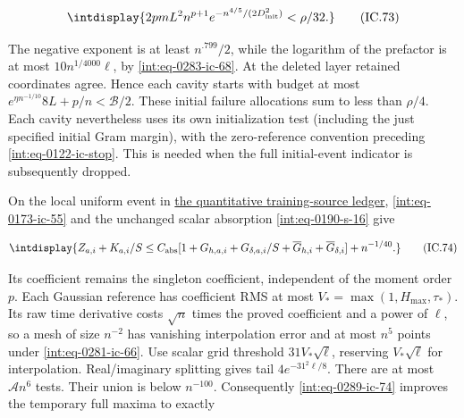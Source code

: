 \begingroup\renewcommand{\theHequation}{intdisplay.668}
\begin{equation}
\intdisplay{
2pmL^2n^{p+1}e^{-n^{4/5}/(2D_{\rm init}^2)}<\rho/32.
}
\tag{IC.73}
\label{int:eq-0288-ic-73}
\end{equation}
\endgroup


The negative exponent is at least \(n^{.799}/2\), while the logarithm of the prefactor is at most \(10n^{1/4000}\ell\), by \eqref{int:eq-0283-ic-68}. At the deleted layer retained coordinates agree. Hence each cavity starts with budget at most \(e^{\eta n^{-1/10}}8L+p/n<\mathcal B/2\). These initial failure allocations sum to less than \(\rho/4\). Each cavity nevertheless uses its own initialization test (including the just specified initial Gram margin), with the zero-reference convention preceding \eqref{int:eq-0122-ic-stop}. This is needed when the full initial-event indicator is subsequently dropped.



On the local uniform event in \hyperref[int:source-quantitative-ledger]{the quantitative training-source ledger}, \eqref{int:eq-0173-ic-55} and the unchanged scalar absorption \eqref{int:eq-0190-s-16} give


\begingroup\renewcommand{\theHequation}{intdisplay.669}
\begin{equation}
\intdisplay{
Z_{a,i}+K_{a,i}/S\le C_{\rm abs}
 [1+G_{h,a,i}+G_{\delta,a,i}/S+
                      \overline G_{h,i}+\overline G_{\delta,i}]
                       +n^{-1/40}.
}
\tag{IC.74}
\label{int:eq-0289-ic-74}
\end{equation}
\endgroup


Its coefficient remains the singleton coefficient, independent of the moment order \(p\). Each Gaussian reference has coefficient RMS at most \(V_*=\max(1,\allowbreak H_{\max},\allowbreak \tau_*)\). Its raw time derivative costs \(\sqrt n\) times the proved coefficient and a power of \(\ell\), so a mesh of size \(n^{-2}\) has vanishing interpolation error and at most \(n^5\) points under \eqref{int:eq-0281-ic-66}. Use scalar grid threshold \(31V_*\sqrt\ell\), reserving \(V_*\sqrt\ell\) for interpolation. Real/imaginary splitting gives tail \(4e^{-31^2\ell/8}\). There are at most \(\mathcal A n^6\) tests. Their union is below \(n^{-100}\). Consequently \eqref{int:eq-0289-ic-74} improves the temporary full maxima to exactly


